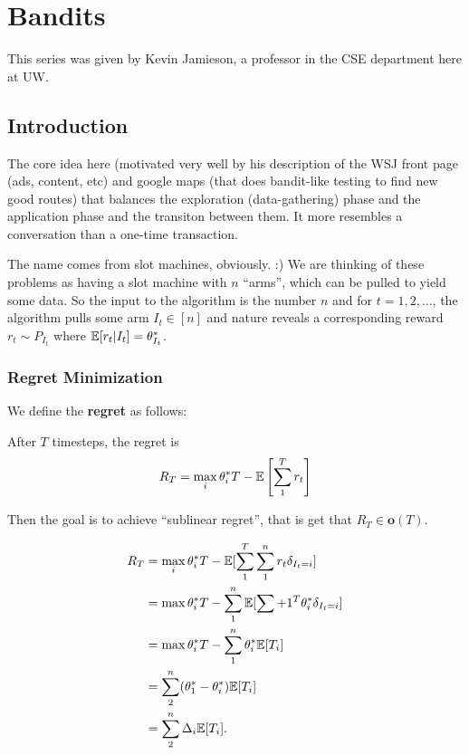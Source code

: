 \documentclass[12pt]{article}
\begin{document}


\section{Bandits}
This series was given by Kevin Jamieson, a professor in the CSE department here at UW.

\subsection{Introduction}
The core idea here (motivated very well by his description of the WSJ front page (ads, content, etc) and google maps (that does bandit-like testing to find new good routes) that balances
the exploration (data-gathering) phase and the application phase and the transiton between them. It more resembles a conversation than a one-time transaction.

The name comes from slot machines, obviously. :) We are thinking of these problems as having a slot machine with $n$ ``arms'', which can be pulled to yield some data.
So the input to the algorithm is the number $n$ and for $t=1,2,\dots$, the algorithm pulls some arm $I_t\in[n]$ and nature reveals a corresponding reward $r_t\sim P_{I_t}$ where 
$\mathbb{E}[r_t|I_t]=\theta_{I_t}^\ast$.

\subsubsection{Regret Minimization}
We define the \textbf{regret} as follows:
\begin{defn}
	After $T$ timesteps, the regret is 
	\[R_T=\max_i\theta_i^\ast T-\mathbb{E}\left[\sum_1^T r_t\right]\]
\end{defn}
Then the goal is to achieve ``sublinear regret'', that is get that $R_T\in\mathbf{o}(T)$.
\begin{lem}
	\begin{align*}
		R_T&=\max_i\theta_i^\ast T-\mathbb{E}[\sum_1^T\sum_1^n r_t\delta_{I_t=i}]\\
		&=\max\theta_i^\ast T - \sum_1^n\mathbb{E}[\sum+1^T\theta_i^\ast\delta_{I_t=i}]\\
		&=\max\theta_i^\ast T-\sum_1^n\theta_i^\ast\mathbb{E}[T_i]\\
		&=\sum_2^n(\theta_1^\ast-\theta_i^\ast)\mathbb{E}[T_i]\\
		&=\sum_2^n\Delta_i\mathbb{E}[T_i].
	\end{align*}
\end{lem}
\end{document}
